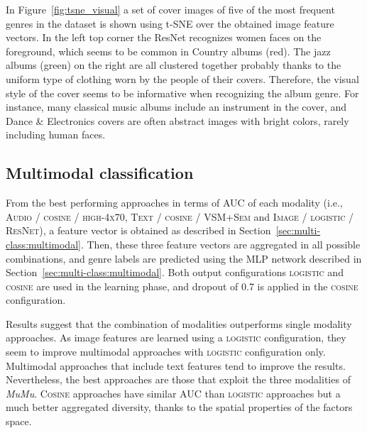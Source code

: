 In Figure~\ref{fig:tsne_visual} a set of cover images of five of the most frequent genres in the dataset is shown using t-SNE over the obtained image feature vectors. 
In the left top corner the ResNet recognizes women faces on the foreground, which seems to be common in Country albums (red).
The jazz albums (green) on the right are all clustered together probably thanks to the uniform type of clothing worn by the people of their covers. 
Therefore, the visual style of the cover seems to be informative when recognizing the album genre.
For instance, many classical music albums include an instrument in the cover, and Dance \& Electronics covers are often abstract images with bright colors, rarely including human faces.

\subsection{Multimodal classification}\label{sec:multi-class:multiexp}

From the best performing approaches in terms of AUC of each modality (i.e., \textsc{Audio} / \textsc{cosine} / \textsc{high-4x70}, \textsc{Text} / \textsc{cosine} / \textsc{VSM+Sem} and \textsc{Image} / \textsc{logistic} / \textsc{ResNet}), a feature vector is obtained as described in Section~\ref{sec:multi-class:multimodal}. 
Then, these three feature vectors are aggregated in all possible combinations, and genre labels are predicted using the MLP network described in Section~\ref{sec:multi-class:multimodal}.
Both output configurations \textsc{logistic} and \textsc{cosine} are used in the learning phase, and dropout of 0.7 is applied in the \textsc{cosine} configuration.

Results suggest that the combination of modalities outperforms single modality approaches. 
As image features are learned using a \textsc{logistic} configuration, they seem to improve multimodal approaches with \textsc{logistic} configuration only. 
Multimodal approaches that include text features tend to improve the results. %
Nevertheless, the best approaches are those that exploit the three modalities of \emph{MuMu}. \textsc{Cosine} approaches have similar AUC than \textsc{logistic} approaches but a much better aggregated diversity, thanks to the spatial properties of the factors space. 

